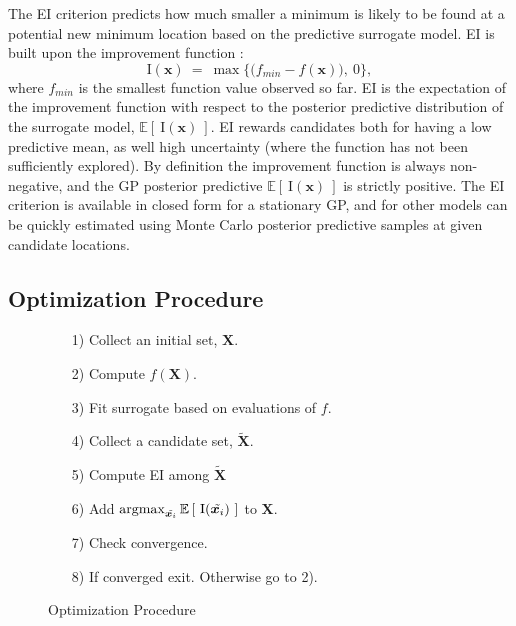 \documentclass[12pt]{article}
\newcommand{\E}[1]{
        \mathbb{E}\left[~#1~\right]
}
\newcommand{\argmax}{\operatornamewithlimits{argmax}}
\def \Eix {
        \mathbb{E}\left[~\text{I}(\bm{x})~\right]
}
\def \ix {
        \text{I}(\bm{x})
}
\begin{document}
%
The EI criterion predicts how much smaller a minimum is likely to be found at a potential new minimum location based on the predictive surrogate model.  EI is built upon the improvement function \citep{jonesEIOpt}:
%
\begin{equation}
\ix~=~ \max \Big\{ \big(f_{min} - f(\bm{x})\big), ~0 \Big\},
\label{ix}
\end{equation}
%
where $f_{min}$ is the smallest function value observed so far.  EI is the expectation of the improvement function with respect to the posterior predictive distribution of the surrogate model, $\Eix$.
EI rewards candidates both for having a low predictive mean, as well high uncertainty (where the function has not been sufficiently explored).
%
By definition the improvement function is always non-negative, and the GP posterior predictive $\Eix$ is strictly positive.
%
The EI criterion is available in closed form for a stationary GP, and for other models can be quickly estimated using Monte Carlo posterior predictive samples at given candidate locations.

%
%
\subsection{Optimization Procedure}
%
%

%
%
\begin{figure}
        \vspace{-1.6cm}
        \singlespacing
        \caption{Optimization Procedure}
        \begin{itemize}
        \item[1)] Collect an initial set, $\bm{X}$.
        \item[2)] Compute $f(\bm{X})$.
        \item[3)] Fit surrogate based on evaluations of $f$.
        \item[4)] Collect a candidate set, $\tilde{\bm{X}}$.
        \item[5)] Compute EI among $\tilde{\bm{X}}$
        \item[6)] Add $\argmax_{\tilde{\bm{x}_i}} \E{\text{I}(\tilde{\bm{x}_i})}$ to $\bm{X}$.
        \item[7)] Check convergence.
        \item[8)] If converged exit. Otherwise go to 2).
        \end{itemize}
        \doublespacing
        \label{procedure}
\end{figure}
%
%
\end{document}
